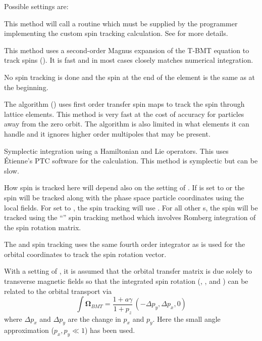 Possible  settings are:
\begin{description}
%
\item[\vn{Custom}] \Newline
This method will call a routine  which must be supplied by the programmer
implementing the custom spin tracking calculation. See  for more details.
%
\item[\vn{Magnus}] \Newline
This method uses a second-order Magnus expansion of the T-BMT equation to track spins ().
It is fast and in most cases closely matches numerical integration.
%
\item[\vn{Off}] \Newline
No spin tracking is done and the spin at the end of the element is the same as at the beginning.
%
\item[\vn{Sprint}] \Newline
The  algorithm () uses first order transfer spin maps to track the
spin through lattice elements. This method is very fast at the cost of accuracy for particles away
from the zero orbit. The algorithm is also limited in what elements it can handle and it ignores
higher order multipoles that may be present.
%
\item[\vn{Symp_Lie_PTC}] \Newline
Symplectic integration using a Hamiltonian and Lie operators.  This uses \'Etienne's PTC software
for the calculation.  This method is symplectic but can be slow.
%
\item[\vn{Tracking}] \Newline
How spin is tracked here will depend also on the setting of . If
 is set to  or  the spin will be tracked
along with the phase space particle coordinates using the local fields. For  set
to , the spin tracking will use .  For all other s, the
spin will be tracked using the ``'' spin tracking method which involves Romberg
integration of the spin rotation matrix.

The  and  spin tracking uses the same fourth order integrator
as is used for the orbital coordinates to track the spin rotation vector.
%
\item[\vn{Transverse_Kick}] \Newline
With a setting of , it is assumed that the orbital transfer matrix is due solely
to transverse magnetic fields so that the integrated spin rotation (, , and
) can be related to the orbital transport via
\begin{equation}
  \int {\pmb\Omega}_{BMT} = \frac{1 + a \gamma}{1 + p_z} \, (-\Delta p_y, \Delta p_x, 0)
\end{equation}
where $\Delta p_x$ and $\Delta p_y$ are the change in $p_x$ and $p_y$.
Here the small angle approximation ($p_x, p_y \ll 1$) has been used.
\end{description}


